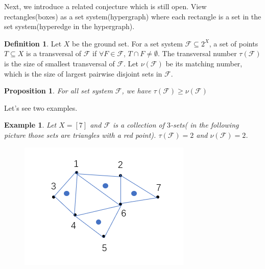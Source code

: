 \documentclass{article}
\newtheorem{proposition}[theorem]{Proposition}
\newtheorem{example}[theorem]{Example}
\theoremstyle{definition}
\newtheorem{definition}[theorem]{Definition}
\begin{document}
Next, we  introduce a related conjecture which is still open. View rectangles(boxes) as a set system(hypergraph) where each rectangle is a set in the set system(hyperedge in the hypergraph).
\begin{definition}
    Let $X$ be the ground set.  For a set system $\mathcal{F}\subseteq 2^X$, a set of points $T\subseteq X$ is a transversal of $\mathcal{F}$ if $\forall F \in \mathcal{F}$, $T\cap F\neq \emptyset$. The transversal number $\tau(\mathcal{F})$ is the size of smallest transversal of $\mathcal{F}$. Let $\nu (\mathcal{F})$ be its matching number, which is the size of largest pairwise disjoint sets in $\mathcal{F}$.
\end{definition}

\begin{proposition}
    For all set system $\mathcal{F}$, we have $\tau(\mathcal{F})\geq \nu (\mathcal{F})$
\end{proposition}
Let's see two examples.
\begin{example}
    Let $X=[7]$ and $\mathcal{F}$ is a collection of $3$-sets( in the following picture those sets are triangles with a red point). $\tau(\mathcal{F})=2$ and $\nu(\mathcal{F})=2$.
    \begin{figure}[H]
        \centering
        \includegraphics[scale=0.7]{15-1.png}
    \end{figure}
\end{example}
\end{document}
